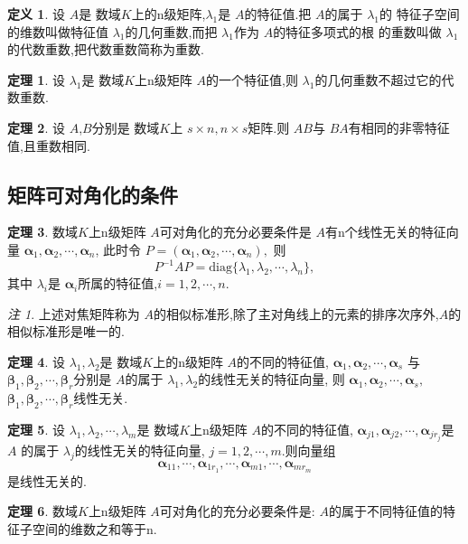 \documentclass[a4paper,11pt]{article}%
\theoremstyle{remark}
\newtheorem*{remark}{注}
\theoremstyle{definition}
\newtheorem{theorem}{定理}[section]
\theoremstyle{definition}
\newtheorem*{definition}{定义}
\theoremstyle{plain}
\begin{document}
\begin{definition}
    设 $A$是 数域$K$上的n级矩阵,$\lambda_1$是 $A$的特征值.把 $A$的属于 $\lambda_1$的
    特征子空间的维数叫做特征值 $\lambda_1$的几何重数,而把 $\lambda_1$作为 $A$的特征多项式的根
    的重数叫做 $\lambda_1$的代数重数,把代数重数简称为重数.
\end{definition}
\begin{theorem}
    设 $\lambda_1$是 数域$K$上n级矩阵 $A$的一个特征值,则 $\lambda_1$的几何重数不超过它的代数重数.
\end{theorem}
\begin{theorem}
    设 $A$,$B$分别是 数域$K$上 $s\times n,n\times s$矩阵.则 $AB$与 $BA$有相同的非零特征值,且重数相同.
\end{theorem}
\subsection{矩阵可对角化的条件}
\begin{theorem}
    数域$K$上n级矩阵 $A$可对角化的充分必要条件是 $A$有n个线性无关的特征向量 $\bm{\alpha}_1,\bm{\alpha}_2,\cdots,\bm{\alpha}_n$,
    此时令 $P=(\bm{\alpha}_1,\bm{\alpha}_2,\cdots,\bm{\alpha}_n),$
    则
    \[P^{-1}AP=\text{diag}\{\lambda_1,\lambda_2,\cdots,\lambda_n\},\]
    其中 $\lambda_i$是 $\bm{\alpha}_i$所属的特征值,$i=1,2,\cdots,n$.
\end{theorem}
\begin{remark}
    上述对焦矩阵称为 $A$的相似标准形,除了主对角线上的元素的排序次序外,$A$的相似标准形是唯一的.
\end{remark}
\begin{theorem}
    设 $\lambda_1,\lambda_2$是 数域$K$上的n级矩阵 $A$的不同的特征值, $\bm{\alpha}_1,\bm{\alpha}_2,\cdots,\bm{\alpha}_s$
    与 $\bm{\beta}_1,\bm{\beta}_2,\cdots,\bm{\beta}_r$分别是 $A$的属于 $\lambda_1,\lambda_2$的线性无关的特征向量,
    则 $\bm{\alpha}_1,\bm{\alpha}_2,\cdots,\bm{\alpha}_s,$$\bm{\beta}_1,\bm{\beta}_2,\cdots,\bm{\beta}_r$线性无关.
\end{theorem}
\begin{theorem}
    设 $\lambda_1,\lambda_2,\cdots,\lambda_m$是 数域$K$上n级矩阵 $A$的不同的特征值, $\bm{\alpha}_{j1} ,\bm{\alpha}_{j2}   ,\cdots,\bm{\alpha}_{j{r_j}}  $是 $A$
    的属于 $\lambda_j$的线性无关的特征向量, $j=1,2,\cdots,m$.则向量组
    \[\bm{\alpha}_{11},\cdots,\bm{\alpha}_{1r_1},\cdots,\bm{\alpha}_{m1},\cdots,\bm{\alpha}_{mr_m}\]
    是线性无关的.
\end{theorem}
\begin{theorem}
    数域$K$上n级矩阵 $A$可对角化的充分必要条件是: $A$的属于不同特征值的特征子空间的维数之和等于n.
\end{theorem}
\end{document}
